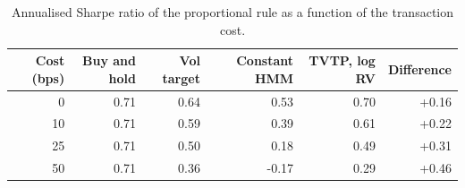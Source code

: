 \begin{table}[t]\centering\small
\caption{Annualised Sharpe ratio of the proportional rule as a function of the transaction cost.}\label{tab:cost}
\begin{tabular}{rrrrrr}\toprule Cost (bps) & Buy and hold & Vol target & Constant HMM & TVTP, log RV & Difference \\ \midrule
0 & 0.71 & 0.64 & 0.53 & 0.70 & +0.16 \\
10 & 0.71 & 0.59 & 0.39 & 0.61 & +0.22 \\
25 & 0.71 & 0.50 & 0.18 & 0.49 & +0.31 \\
50 & 0.71 & 0.36 & -0.17 & 0.29 & +0.46 \\
\bottomrule\end{tabular}\end{table}
